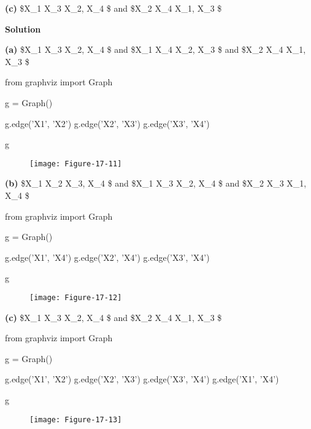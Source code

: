 \textbf{(c)} \$X\_1  X\_3 \textbar{} X\_2, X\_4 \$ and \$X\_2
 X\_4 \textbar{} X\_1, X\_3 \$

\textbf{Solution}

\textbf{(a)} \$X\_1  X\_3 \textbar{} X\_2, X\_4 \$ and \$X\_1
 X\_4 \textbar{} X\_2, X\_3 \$ and \$X\_2  X\_4
\textbar{} X\_1, X\_3 \$

\begin{python}
from graphviz import Graph

g = Graph()

g.edge('X1', 'X2')
g.edge('X2', 'X3')
g.edge('X3', 'X4')

g
\end{python}

\begin{figure}[H]
\texttt{[image: Figure-17-11]}
\end{figure}

\textbf{(b)} \$X\_1  X\_2 \textbar{} X\_3, X\_4 \$ and \$X\_1
 X\_3 \textbar{} X\_2, X\_4 \$ and \$X\_2  X\_3
\textbar{} X\_1, X\_4 \$

\begin{python}
from graphviz import Graph

g = Graph()

g.edge('X1', 'X4')
g.edge('X2', 'X4')
g.edge('X3', 'X4')

g
\end{python}
 
\begin{figure}[H]
\texttt{[image: Figure-17-12]}
\end{figure}


\textbf{(c)} \$X\_1  X\_3 \textbar{} X\_2, X\_4 \$ and \$X\_2
 X\_4 \textbar{} X\_1, X\_3 \$

\begin{python}
from graphviz import Graph

g = Graph()

g.edge('X1', 'X2')
g.edge('X2', 'X3')
g.edge('X3', 'X4')
g.edge('X1', 'X4')

g
\end{python}

\begin{figure}[H]
\texttt{[image: Figure-17-13]}
\end{figure}


